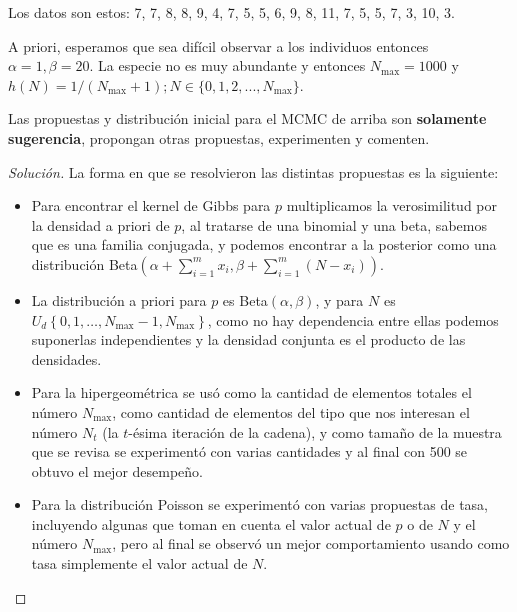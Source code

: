 \documentclass{article}
\begin{document}
\begin{enumerate}
\begin{itemize}
    Los datos son estos: 7, 7, 8, 8, 9, 4, 7, 5, 5, 6, 9, 8, 11, 7, 5, 5, 7, 3, 10, 3.
    
    A priori, esperamos que sea difícil observar a los individuos entonces $\alpha = 1, \beta = 20$. La especie no es muy abundante y entonces $N_{\max} = 1000$ y $h(N ) = 1/(N_{\max} + 1); N \in \{0, 1, 2, . . . , N_{\max}\}$.

    Las propuestas y distribución inicial para el MCMC de arriba son \textbf{solamente sugerencia}, propongan otras propuestas, experimenten y comenten.
    \end{itemize}


    \begin{proof}[Solución]
        La forma en que se resolvieron las distintas propuestas es la siguiente:

        \begin{itemize}
            \item Para encontrar el kernel de Gibbs para $p$ multiplicamos la 
            verosimilitud por la densidad a priori de $p$, al tratarse de una binomial 
            y una beta, sabemos que es una familia conjugada, y podemos encontrar a la
            posterior como una distribución Beta$\left(\alpha + \sum_{i=1}^m x_i,
            \beta + \sum_{i=1}^m (N-x_i) \right)$.
            
            \item La distribución a priori para $p$ es Beta$(\alpha,\beta)$, y para 
            $N$ es $U_d\left\{0,1,\dots,N_{\max}-1,N_{\max}\right\}$, como no hay 
            dependencia entre ellas podemos suponerlas independientes y la densidad 
            conjunta es el producto de las densidades.

            \item Para la hipergeométrica se usó como la cantidad de elementos totales 
            el número $N_{\max}$, como cantidad de elementos del tipo que nos interesan el
            número $N_t$ (la $t$-ésima iteración de la cadena), y como tamaño de la muestra
            que se revisa se experimentó con varias cantidades y al final con 500 se obtuvo 
            el mejor desempeño.

            \item Para la distribución Poisson se experimentó con varias propuestas de tasa,
            incluyendo algunas que toman en cuenta el valor actual de $p$ o de $N$ y el número
            $N_{\max}$, pero al final se observó un mejor comportamiento usando como tasa
            simplemente el valor actual de $N$.


\end{itemize}
\end{proof}
\end{enumerate}
\end{document}
